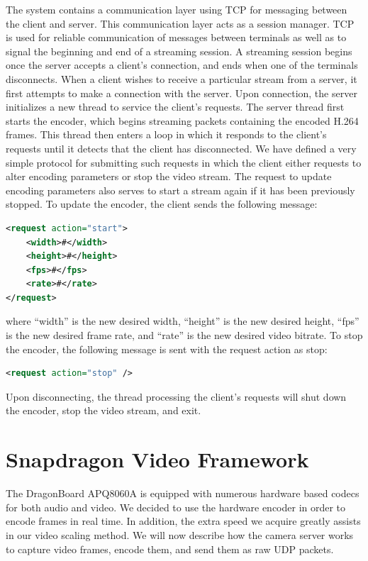 The system contains a communication layer using TCP for messaging between the client and server. This communication layer acts as a session manager. TCP is used for reliable communication of messages between terminals as well as to signal the beginning and end of a streaming session. A streaming session begins once the server accepts a client's connection, and ends when one of the terminals disconnects. When a client wishes to receive a particular stream from a server, it first attempts to make a connection with the server. Upon connection, the server initializes a new thread to service the client's requests. The server thread first starts the encoder, which begins streaming packets containing the encoded H.264 frames. This thread then enters a loop in which it responds to the client's requests until it detects that the client has disconnected. We have defined a very simple protocol for submitting such requests in which the client either requests to alter encoding parameters or stop the video stream. The request to update encoding parameters also serves to start a stream again if it has been previously stopped. To update the encoder, the client sends the following message:
%
\begin{lstlisting}[language=xml, frame=single]
<request action="start">
	<width>#</width>
	<height>#</height>
	<fps>#</fps>
	<rate>#</rate>
</request>
\end{lstlisting}
where ``width'' is the new desired width, ``height'' is the new desired height, ``fps'' is the new desired frame rate, and ``rate'' is the new desired video bitrate. To stop the encoder, the following message is sent with the request action as stop:
%
\begin{lstlisting}[language=xml, frame=single]
<request action="stop" />
\end{lstlisting}
Upon disconnecting, the thread processing the client's requests will shut down the encoder, stop the video stream, and exit.


\section{Snapdragon Video Framework}
\label{sec:Snapdragon}

The DragonBoard APQ8060A is equipped with numerous hardware based codecs for both audio and video. We decided to use the hardware encoder in order to encode frames in real time. In addition, the extra speed we acquire greatly assists in our video scaling method. We will now describe how the camera server works to capture video frames, encode them, and send them as raw UDP packets.

